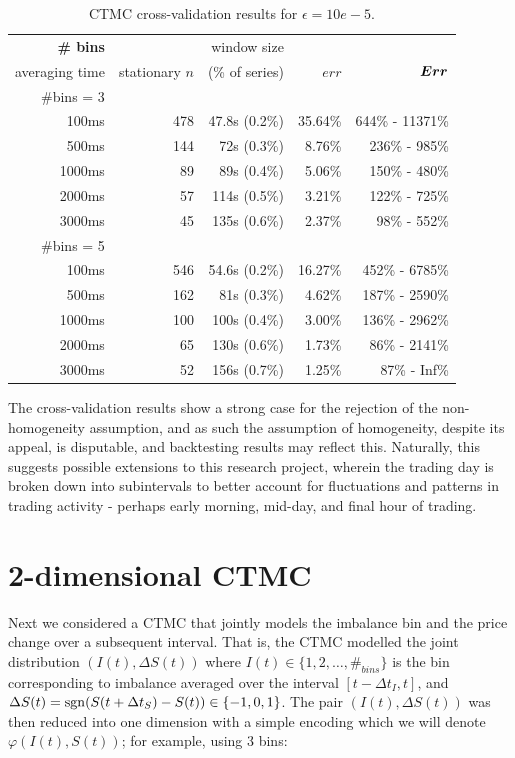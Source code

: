 \begin{table}[H]
\centering
{}
\begin{tabular}{@{}rrrrr@{}}
\toprule
\bf \# bins & & window size & & \\ averaging time & stationary $n$ & (\% of series) & $err$ & $\boldsymbol{Err}$ \\
\midrule
\#bins = 3 &&&& \\
100ms & 478 & 47.8s (0.2\%) & 35.64\% & 644\% - 11371\% \\
500ms & 144 & 72s (0.3\%) & 8.76\% & 236\% - 985\% \\
1000ms & 89 & 89s (0.4\%) &  5.06\% & 150\% - 480\% \\
2000ms & 57 & 114s (0.5\%) & 3.21\% & 122\% - 725\% \\
3000ms & 45 & 135s (0.6\%) & 2.37\% & 98\% - 552\% \\
\#bins = 5 &&&& \\
100ms & 546 & 54.6s (0.2\%) & 16.27\% & 452\% - 6785\% \\
500ms & 162 & 81s (0.3\%) &  4.62\% & 187\% - 2590\% \\
1000ms & 100 & 100s (0.4\%) & 3.00\% & 136\% - 2962\% \\
2000ms & 65 & 130s (0.6\%)  & 1.73\% & 86\% - 2141\% \\
3000ms & 52 & 156s (0.7\%) &  1.25\% & 87\% - Inf\% \\
\bottomrule
\end{tabular}
\caption{CTMC cross-validation results for $\epsilon = 10e-5$.}
\end{table}

The cross-validation results show a strong case for the rejection of the non-homogeneity assumption, and as such the assumption of homogeneity, despite its appeal, is disputable, and backtesting results may reflect this. Naturally, this suggests possible extensions to this research project, wherein the trading day is broken down into subintervals to better account for fluctuations and patterns in trading activity - perhaps early morning, mid-day, and final hour of trading.

\section{2-dimensional CTMC}
Next we considered a CTMC that jointly models the imbalance bin and the price change over a subsequent interval. That is, the CTMC modelled the joint distribution $(I(t), \Delta S(t))$ where $I(t) \in \lbrace 1,2,\dots,\#_{bins} \rbrace$ is the bin corresponding to imbalance averaged over the interval $[t-\Delta t_I, t]$, and $\Delta S(t) = \operatorname{\mathrm{sgn}}(S(t+\Delta t_S)-S(t)) \in \lbrace -1, 0, 1 \rbrace$.  The pair $(I(t), \Delta S(t))$ was then reduced into one dimension with a simple encoding which we will denote $\varphi(I(t),S(t))$; for example, using 3 bins:

